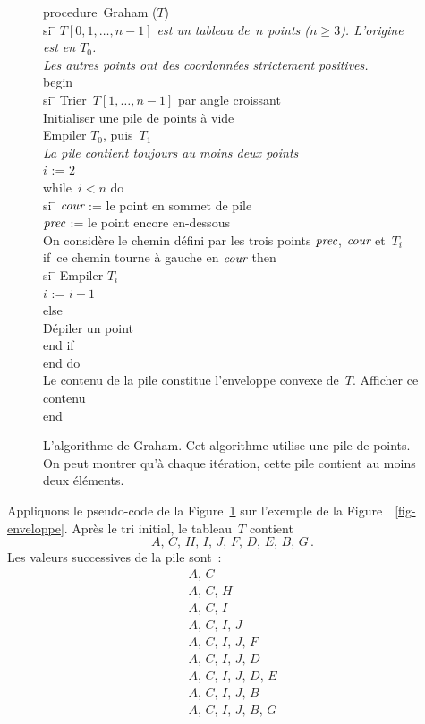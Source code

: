 \documentclass[11pt]{article}
\newcommand{\PROCEDURE}{{\sffamily procedure}}
\newcommand{\BEGIN}{{\sffamily begin}}
\newcommand{\END}{{\sffamily end}}
\newcommand{\IF}{{\sffamily if}}
\newcommand{\THEN}{{\sffamily then}}
\newcommand{\ELSE}{{\sffamily else}}
\newcommand{\ENDIF}{{\sffamily end if}}
\newcommand{\WHILE}{{\sffamily while}}
\newcommand{\DO}{{\sffamily do}}
\newcommand{\ENDDO}{{\sffamily end do}}
\newcommand{\INDENTER}{{\sffamily si} \=\+\kill}
\newcounter{points_counter}
\begin{document}
\begin{figure}[ht]
\begin{tabbing}
\PROCEDURE\ {\sffamily Graham} ($T$)\\
\INDENTER
{\em $T[0,1,\ldots,n-1]$ est un tableau de~$n$ points ($n \geq 3$). 
L'origine est en $T_0$.} \\
\quad
{\em Les autres points ont des coordonnées strictement positives.} \\
\BEGIN \\
\INDENTER
    Trier~$T [1, \ldots, n-1]$ par angle croissant \\
    Initialiser une pile de points à vide \\
    Empiler $T_0$, puis~$T_1$ \\
\< {\em La pile contient toujours au moins deux points } \\
    $i$ := $2$ \\
    \WHILE\ $i < n$ \DO \\
    \INDENTER
        $\mbox{\em cour}$ := le point en sommet de pile \\
        $\mbox{\em prec}$ := le point encore en-dessous \\
        On considère le chemin défini par les trois points
                $\mbox{\em prec}$, $\mbox{\em cour}$ et~$T_i$ \\
        \IF\ ce chemin tourne à gauche en $\mbox{\em cour}$ \THEN \\
        \INDENTER
            Empiler $T_i$ \\
            $i$ := $i+1$ \\
        \< \ELSE \\
            Dépiler un point \-\\
        \ENDIF \-\\
    \ENDDO \\
    Le contenu de la pile constitue l'enveloppe convexe de~$T$.
    Afficher ce contenu \-\\
\END
\end{tabbing}
\caption{L'algorithme de Graham. Cet algorithme utilise une pile
de points. On peut montrer qu'à chaque itération, cette pile
contient au moins deux éléments.}
\label{algo-Graham}
\end{figure}

Appliquons le pseudo-code de la Figure~\ref{algo-Graham}
sur l'exemple de la Figure~~\ref{fig-enveloppe}.
Après le tri initial, le tableau~$T$ contient
$$A,\, C,\, H,\, I,\, J,\, F,\, D,\, E,\, B,\, G\,.$$
Les valeurs successives de la pile sont~:
$$\begin{array}{l}
A,\,C \\
A,\, C,\, H \\
A,\, C,\, I \\
A,\, C,\, I,\,J \\
A,\, C,\, I,\,J,\,F \\
A,\, C,\, I,\,J,\,D \\
A,\, C,\, I,\,J,\,D,\,E \\
A,\, C,\, I,\,J,\,B \\
A,\, C,\, I,\,J,\,B,\,G
\end{array}$$
\end{document}
